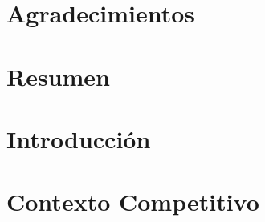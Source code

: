 \documentclass[a4paper, 11pt, oneside]{memoir}
\title{\izenburua}
\author{\egilea}
\date{\data}
\begin{document}

% 


\cleardoublepage
\frontmatter


\chapter*{Agradecimientos}

\cleardoublepage


\chapter*{Resumen}

\cleardoublepage



\cleardoublepage


\tableofcontents
\clearpage
\listoffigures
\clearpage
\listoftables
\clearpage


\cleardoublepage
\mainmatter
\pagestyle{ruled}

% 

\chapter{Introducción} \label{ch:introduccion}

\cleardoublepage

\chapter{Contexto Competitivo} \label{ch:contextoCompetitivo}

\cleardoublepage
\end{document}
